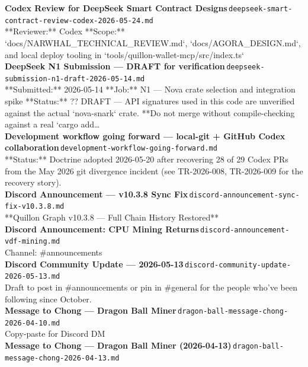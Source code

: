 \documentclass[11pt,a4paper]{article}
\begin{document}
\noindent\textbf{Codex Review for DeepSeek Smart Contract Designs}\,\textcolor{qgray}{\small \texttt{deepseek-smart-contract-review-codex-2026-05-24.md}}\\
**Reviewer:** Codex **Scope:** `docs/NARWHAL\_TECHNICAL\_REVIEW.md`, `docs/AGORA\_DESIGN.md`, and local deploy tooling in `tools/quillon-wallet-mcp/src/index.ts`\\[6pt]
\noindent\textbf{DeepSeek N1 Submission --- DRAFT for verification}\,\textcolor{qgray}{\small \texttt{deepseek-submission-n1-draft-2026-05-14.md}}\\
**Submitted:** 2026-05-14 **Job:** N1 --- Nova crate selection and integration spike **Status:** ?? DRAFT --- API signatures used in this code are unverified against the actual `nova-snark` crate. **Do not merge without compile-checking against a real `cargo add\ldots{}\\[6pt]
\noindent\textbf{Development workflow going forward --- local-git + GitHub Codex collaboration}\,\textcolor{qgray}{\small \texttt{development-workflow-going-forward.md}}\\
**Status:** Doctrine adopted 2026-05-20 after recovering 28 of 29 Codex PRs from the May 2026 git divergence incident (see TR-2026-008, TR-2026-009 for the recovery story).\\[6pt]
\noindent\textbf{Discord Announcement --- v10.3.8 Sync Fix}\,\textcolor{qgray}{\small \texttt{discord-announcement-sync-fix-v10.3.8.md}}\\
**Quillon Graph v10.3.8 --- Full Chain History Restored**\\[6pt]
\noindent\textbf{Discord Announcement: CPU Mining Returns}\,\textcolor{qgray}{\small \texttt{discord-announcement-vdf-mining.md}}\\
Channel: \#announcements\\[6pt]
\noindent\textbf{Discord Community Update --- 2026-05-13}\,\textcolor{qgray}{\small \texttt{discord-community-update-2026-05-13.md}}\\
Draft to post in \#announcements or pin in \#general for the people who've been following since October.\\[6pt]
\noindent\textbf{Message to Chong --- Dragon Ball Miner}\,\textcolor{qgray}{\small \texttt{dragon-ball-message-chong-2026-04-10.md}}\\
Copy-paste for Discord DM\\[6pt]
\noindent\textbf{Message to Chong --- Dragon Ball Miner (2026-04-13)}\,\textcolor{qgray}{\small \texttt{dragon-ball-message-chong-2026-04-13.md}}\\
\end{document}
